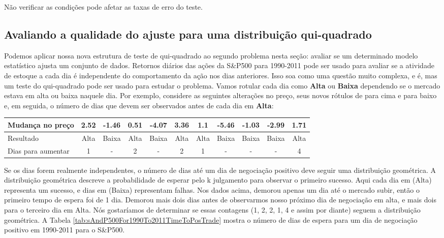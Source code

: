 \documentclass[
]{book}
\theoremstyle{definition}
\theoremstyle{definition}
\theoremstyle{definition}
\theoremstyle{definition}
\theoremstyle{remark}
\begin{document}
Não verificar as condições pode afetar as taxas de erro do teste.

\hypertarget{goodnessFitChiSquare}{%
\subsection{Avaliando a qualidade do ajuste para uma distribuição qui-quadrado}\label{goodnessFitChiSquare}}

Podemos aplicar nossa nova estrutura de teste de qui-quadrado ao segundo problema nesta seção: avaliar se um determinado modelo estatístico ajusta um conjunto de dados. Retornos diários das ações da S\&P500 para 1990-2011 pode ser usado para avaliar se a atividade de estoque a cada dia é independente do comportamento da ação nos dias anteriores. Isso soa como uma questão muito complexa, e é, mas um teste do qui-quadrado pode ser usado para estudar o problema. Vamos rotular cada dia como \textbf{Alta} ou \textbf{Baixa} dependendo se o mercado estava em alta ou baixa naquele dia. Por exemplo, considere as seguintes alterações no preço, seus novos rótulos de para cima e para baixo e, em seguida, o número de dias que devem ser observados antes de cada dia em \textbf{Alta}:

\begin{tabular}{l|c|c|c|c|c|c|c|c|c|c}
\hline
Mudança no preço & 2.52 & -1.46 & 0.51 & -4.07 & 3.36 & 1.1 & -5.46 & -1.03 & -2.99 & 1.71\\
\hline
Resultado & Alta & Baixa & Alta & Baixa & Alta & Alta & Baixa & Baixa & Baixa & Alta\\
\hline
Dias para aumentar & 1 & - & 2 & - & 2 & 1 & - & - & - & 4\\
\hline
\end{tabular}

Se os dias forem realmente independentes, o número de dias até um dia de negociação positivo deve seguir uma distribuição geométrica. A distribuição geométrica descreve a probabilidade de esperar pelo k julgamento para observar o primeiro sucesso. Aqui cada dia em (Alta) representa um sucesso, e dias em (Baixa) representam falhas. Nos dados acima, demorou apenas um dia até o mercado subir, então o primeiro tempo de espera foi de 1 dia. Demorou mais dois dias antes de observarmos nosso próximo dia de negociação em alta, e mais dois para o terceiro dia em Alta. Nós gostaríamos de determinar se essas contagens (1, 2, 2, 1, 4 e assim por diante) seguem a distribuição geométrica. A Tabela \ref{tab:sAndP500For1990To2011TimeToPosTrade} mostra o número de dias de espera para um dia de negociação positivo em 1990-2011 para o S\&P500.
\end{document}
